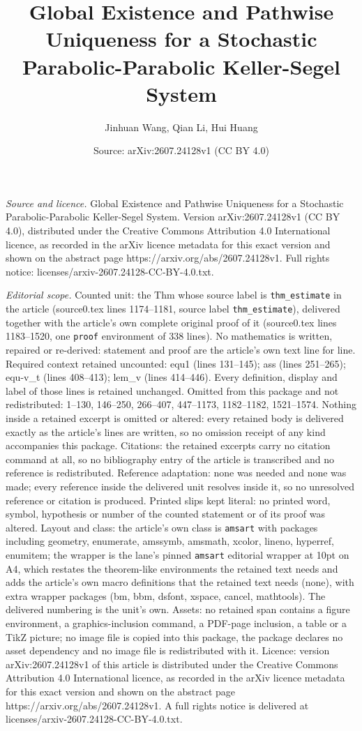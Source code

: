 \documentclass[10pt,a4paper]{amsart}
\title[Global Existence and Pathwise Uniqueness for a Stochastic Pa]{Global Existence and Pathwise Uniqueness for a Stochastic Parabolic-Parabolic Keller-Segel System}
\author{Jinhuan Wang, Qian Li, Hui Huang}
\date{Source: arXiv:2607.24128v1 (CC BY 4.0)}
\begin{document}
\maketitle

\noindent\emph{Source and licence.} Global Existence and Pathwise Uniqueness for a Stochastic Parabolic-Parabolic Keller-Segel System. Version arXiv:2607.24128v1 (CC BY 4.0), distributed under the Creative Commons Attribution 4.0 International licence, as recorded in the arXiv licence metadata for this exact version and shown on the abstract page https://arxiv.org/abs/2607.24128v1. Full rights notice: licenses/arxiv-2607.24128-CC-BY-4.0.txt.\par\smallskip

\noindent\textit{Editorial scope.} Counted unit: the Thm whose source label is \texttt{thm\_estimate} in the article (source0.tex lines 1174--1181, source label \texttt{thm\_estimate}), delivered together with the article's own complete original proof of it (source0.tex lines 1183--1520, one \texttt{proof} environment of 338 lines). No mathematics is written, repaired or re-derived: statement and proof are the article's own text line for line. Required context retained uncounted: equ1 (lines 131--145); ass (lines 251--265); equ-v\_t (lines 408--413); lem\_v (lines 414--446). Every definition, display and label of those lines is retained unchanged. Omitted from this package and not redistributed: 1--130, 146--250, 266--407, 447--1173, 1182--1182, 1521--1574. Nothing inside a retained excerpt is omitted or altered: every retained body is delivered exactly as the article's lines are written, so no omission receipt of any kind accompanies this package. Citations: the retained excerpts carry no citation command at all, so no bibliography entry of the article is transcribed and no reference is redistributed. Reference adaptation: none was needed and none was made; every reference inside the delivered unit resolves inside it, so no unresolved reference or citation is produced. Printed slips kept literal: no printed word, symbol, hypothesis or number of the counted statement or of its proof was altered. Layout and class: the article's own class is \texttt{amsart} with packages including geometry, enumerate, amssymb, amsmath, xcolor, lineno, hyperref, enumitem; the wrapper is the lane's pinned \texttt{amsart} editorial wrapper at 10pt on A4, which restates the theorem-like environments the retained text needs and adds the article's own macro definitions that the retained text needs (none), with extra wrapper packages (bm, bbm, dsfont, xspace, cancel, mathtools). The delivered numbering is the unit's own. Assets: no retained span contains a figure environment, a graphics-inclusion command, a PDF-page inclusion, a table or a TikZ picture; no image file is copied into this package, the package declares no asset dependency and no image file is redistributed with it. Licence: version arXiv:2607.24128v1 of this article is distributed under the Creative Commons Attribution 4.0 International licence, as recorded in the arXiv licence metadata for this exact version and shown on the abstract page https://arxiv.org/abs/2607.24128v1. A full rights notice is delivered at licenses/arxiv-2607.24128-CC-BY-4.0.txt. 
\end{document}
